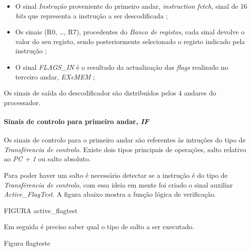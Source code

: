 \documentclass[11pt]{article}
\numberwithin{equation}{section}
\begin{document}
\begin{itemize}
	\item  O sinal \textit{Instrução} proveniente do primeiro andar, \textit{instruction fetch}, sinal de 16 \textit{bits} que representa a instrução a ser descodificada   ;
	\vspace{-2.5mm}
	\item Os sinais (R0, \ldots, R7), procedentes do \textit{Banco de registos}, cada sinal devolve o valor do seu registo, sendo posteriormente selecionado o registo indicado pela instrução ;
	\vspace{-2.5mm}
	\item  O sinal \textit{FLAGS\_IN} é o resultado da actualização das \textit{flags} realizado no terceiro andar, \textit{EXeMEM} ;
\end{itemize}

	Os sinais de saída do descodificador são distribuídos pelos $4$ andares do processador.
	
\paragraph{Sinais de controlo para primeiro andar, \textit{IF}}

	
	Os sinais de controlo para o primeiro andar são referentes às intruções do tipo de \textit{Transfêrencia de controlo}. Existe dois tipos principais de operações, salto relativo ao \textit{PC + 1} ou salto absoluto. 
	
	Para poder haver um salto é necessário detectar se a instrução é do tipo de \textit{Transfêrencia de controlo}, com essa ideia em mente foi criado o sinal auxiliar \textit{Active\_FlagTest}. A figura abaixo mostra a função lógica de verificação. 
	
	FIGURA active\_flagtest
	
	Em seguida é preciso saber qual o tipo de salto a ser executado. 
	
	Figura flagteste
	
\end{document}
